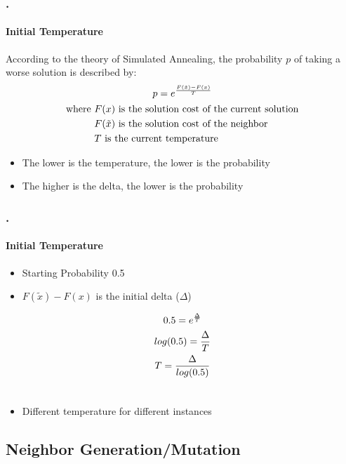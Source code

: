 \documentclass{beamer}
\begin{document}
\begin{frame}
\frametitle{\thesection.\thesubsection \ \insertsubsection}
\framesubtitle{Initial Temperature}
	According to the theory of Simulated Annealing, the probability $p$ of taking a worse solution is described by:
	\begin{gather}\label{eq:3.1}
	p = e^{\frac{F(\tilde{x})-F(x)}{T}}\\
\begin{aligned}
\text{where } &F(x) \text{ is the solution cost of the current solution}\\
&F(\tilde{x}) \text{ is the solution cost of the neighbor}\\
&T \text{ is the current temperature}
\end{aligned}\notag
	\end{gather}
	
\vfill
\begin{itemize}
	\item The lower is the temperature, the lower is the probability
	\item The higher is the delta, the lower is the probability
\end{itemize}

\end{frame}
\begin{frame}
\frametitle{\thesection.\thesubsection \ \insertsubsection}
\framesubtitle{Initial Temperature}
\begin{itemize}
	\item Starting Probability 0.5
	\item $F(\tilde{x})-F(x)$ is the initial delta ($\Delta$)
\end{itemize}
\begin{gather}\label{eq:3.2}
0.5 = e^{\frac{\Delta}{T}}\notag\\
log(0.5) = \frac{\Delta}{T}\notag\\
T = \frac{\Delta}{log(0.5)}\\\notag
\end{gather}

\begin{itemize}
	\item Different temperature for different instances
\end{itemize}

\end{frame}

\subsection{Neighbor Generation/Mutation}
\end{document}
